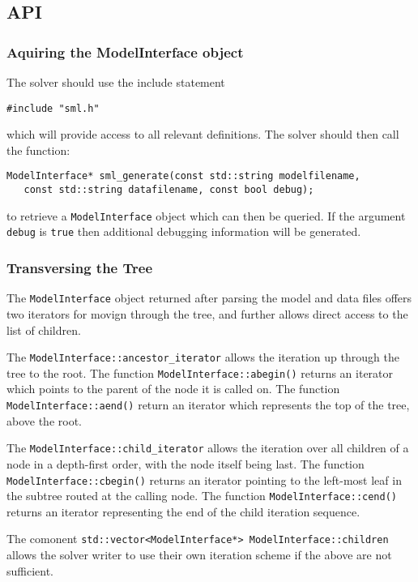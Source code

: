 \documentclass[10pt,a4paper]{book}
\begin{document}
\subsection{API}

\subsubsection{Aquiring the ModelInterface object}
The solver should use the include statement
\begin{verbatim}
#include "sml.h"
\end{verbatim}
which will provide access to all relevant definitions. The solver should then
call the function:

\begin{verbatim}
ModelInterface* sml_generate(const std::string modelfilename, 
   const std::string datafilename, const bool debug);
\end{verbatim}

to retrieve a {\tt ModelInterface} object which can then be queried. If the
argument {\tt debug} is {\tt true} then additional debugging information will
be generated.

\subsubsection{Transversing the Tree}
The {\tt ModelInterface} object returned after parsing the model and data files
offers two iterators for movign through the tree, and further allows direct
access to the list of children.

The {\tt ModelInterface::ancestor\_iterator} allows the iteration up through
the tree to the root. The function {\tt ModelInterface::abegin()} returns an
iterator which points to the parent of the node it is called on. The function
{\tt ModelInterface::aend()} return an iterator which represents the top of the
tree, above the root.

The {\tt ModelInterface::child\_iterator} allows the iteration over all children
of a node in a depth-first order, with the node itself being last. The function
{\tt ModelInterface::cbegin()} returns an iterator pointing to the left-most
leaf in the subtree routed at the calling node. The function 
{\tt ModelInterface::cend()} returns an iterator representing the end of the
child iteration sequence.

The comonent {\tt std::vector<ModelInterface*> ModelInterface::children} allows
the solver writer to use their own iteration scheme if the above are not
sufficient.
\end{document}
